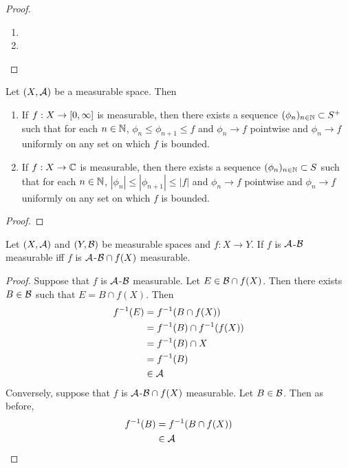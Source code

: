 \documentclass{book}
\begin{document}
	\begin{proof}\
		\begin{enumerate}
			\item 
			\item 
		\end{enumerate}
	\end{proof}
	
	\begin{ex} 
		Let $(X, \mathcal{A})$ be a measurable space. Then 
		\begin{enumerate}
			\item If $f: X \rightarrow [0,\infty]$ is measurable, then there exists a sequence $(\phi_n)_{n \in \mathbb{N}} \subset S^+$ such that for each $n \in \mathbb{N}$, $\phi_n \leq \phi_{n+1} \leq f$ and $\phi_n \rightarrow f$ pointwise and $\phi_n \rightarrow f$ uniformly on any set on which $f$ is bounded.
			
			\item If $f: X \rightarrow \mathbb{C}$ is measurable, then there exists a sequence $(\phi_n)_{n \in \mathbb{N}} \subset S$ such that for each $n \in \mathbb{N}$, $|\phi_n| \leq |\phi_{n+1}| \leq |f|$ and $\phi_n \rightarrow f$ pointwise and $\phi_n \rightarrow f$ uniformly on any set on which $f$ is bounded.
		\end{enumerate}
	\end{ex}

	\begin{proof}
		\tcr{FINISH!!!}
	\end{proof}
	
	\begin{ex} 
		Let $(X, \mathcal{A})$ and $(Y, \mathcal{B})$ be measurable spaces and $f: X \rightarrow Y$. If $f$ is $\mathcal{A}$-$\mathcal{B}$ measurable iff $f$ is $\mathcal{A}$-$\mathcal{B} \cap f(X)$ measurable.
	\end{ex}	
	
	\begin{proof}
		Suppose that $f$ is $\mathcal{A}$-$\mathcal{B}$ measurable. Let $E \in \mathcal{B} \cap f(X)$. Then there exists $B \in \mathcal{B}$ such that $E = B \cap f(X)$. Then 
		\begin{align*}
			f^{-1}(E)
			&= f^{-1}(B \cap f(X)) \\
			&= f^{-1}(B) \cap f^{-1}(f(X)) \\
			&= f^{-1}(B) \cap X \\
			&= f^{-1}(B) \\
			& \in \mathcal{A}
		\end{align*}
		Conversely, suppose that $f$ is  $\mathcal{A}$-$\mathcal{B} \cap f(X)$ measurable. Let $B \in \mathcal{B}$. Then as before, 
		\begin{align*}
			f^{-1}(B) 
			&= f^{-1}(B \cap f(X))  \\
			& \in \mathcal{A} 
		\end{align*}
	\end{proof}
	
\end{document}
